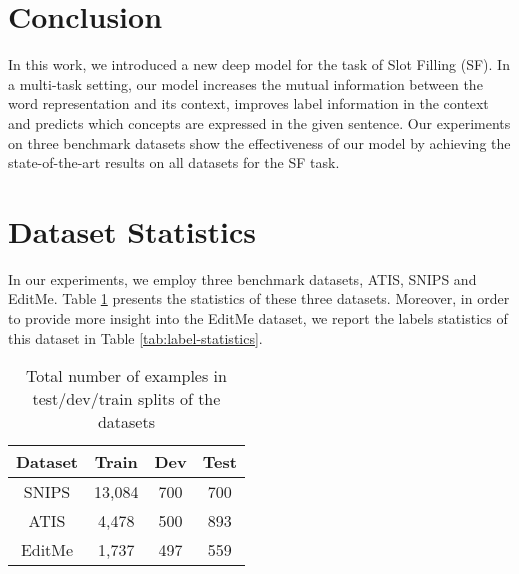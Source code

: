 \documentclass[11pt,a4paper]{article}
\begin{document}
\begin{table}
  \centering
\caption{Test F1-score for the ablated models}
    \label{tab:ablation}
\end{table}

\section{Conclusion}

In this work, we introduced a new deep model for the task of Slot Filling (SF). In a multi-task setting, our model increases the mutual information between the word representation and its context, improves label information in the context and predicts which concepts are expressed in the given sentence. Our experiments on three benchmark datasets show the effectiveness of our model by achieving the state-of-the-art results on all datasets for the SF task.




\clearpage

\appendix

\section{Dataset Statistics}
\label{app:dataset}
In our experiments, we employ three benchmark datasets, ATIS, SNIPS and EditMe. Table \ref{tab:statistics} presents the statistics of these three datasets. Moreover, in order to provide more insight into the EditMe dataset, we report the labels statistics of this dataset in Table \ref{tab:label-statistics}.

\begin{table}[h]
  \centering
\begin{tabular}{c|c|c|c}
    \textbf{Dataset} & \textbf{Train} & \textbf{Dev} & \textbf{Test}  \\
    \hline
    SNIPS & 13,084 & 700 & 700  \\
    ATIS & 4,478 & 500 & 893 \\
    EditMe & 1,737 & 497 & 559 \\
\end{tabular}
    \caption{Total number of examples in test/dev/train splits of the datasets}
    \label{tab:statistics}
\end{table}
\end{document}
